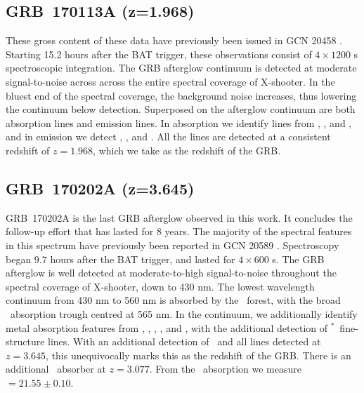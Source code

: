 \documentclass[longauth]{aa}    %
\begin{document}
\subsection{GRB~170113A (z=1.968)}\label{170113}

These gross content of these data have previously been issued in GCN 20458
\citep{GCN20458}. Starting 15.2 hours after the BAT trigger, these observations
consist of $4 \times 1200$ s spectroscopic integration. The GRB afterglow
continuum is detected at moderate signal-to-noise across across the entire
spectral coverage of X-shooter. In the bluest end of the spectral coverage, the
background noise increases, thus lowering the continuum below detection.
Superposed on the afterglow continuum are both absorption lines and emission
lines. In absorption we identify lines from \SIii, \feii, and \mgii, and in
emission we detect \oii, \hb, and \oiii. All the lines are detected at a
consistent redshift of $z=1.968$, which we take as the redshift of the GRB.

\subsection{GRB~170202A (z=3.645)}\label{170202}

GRB~170202A is the last GRB afterglow observed in this work. It concludes the
follow-up effort that has lasted for 8 years. The majority of the spectral
features in this spectrum have previously been reported in GCN 20589
\citep{GCN20589}. Spectroscopy began 9.7 hours after the BAT trigger, and lasted
for $4 \times 600$ s. The GRB afterglow is well detected at moderate-to-high
signal-to-noise throughout the spectral coverage of X-shooter, down to 430 nm.
The lowest wavelength continuum from 430 nm to 560 nm is absorbed by the
\lya~forest, with the broad \lya~absorption trough centred at 565 nm. In the
continuum, we additionally identify metal absorption features from \SIii, \civ,
\SIiv, \feii, and \mgii, with the additional detection of
\SIii$^*$~fine-structure lines. With an additional detection of \oiii~and all
lines detected at $z=3.645$, this unequivocally marks this as the redshift of
the GRB. There is an additional \civ~absorber at $z = 3.077$. From the
\lya~absorption we measure \nh$= 21.55 \pm 0.10$.

%
%
\end{document}
